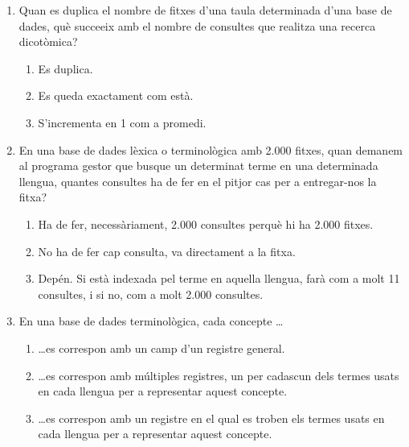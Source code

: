 \begin{enumerate}
\item Quan es duplica el nombre de fitxes d'una taula determinada
  d'una base de dades, què succeeix amb el nombre de consultes que
  realitza una recerca dicotòmica?   
  \begin{enumerate}
  \item Es duplica.
  \item Es queda exactament com està.
  \item S'incrementa en 1 com a promedi.
  \end{enumerate}

\item En una base de dades lèxica o terminològica amb 2.000 fitxes,
  quan demanem al programa gestor que busque un determinat terme en
  una determinada llengua, quantes consultes ha de fer en el pitjor
  cas per a entregar-nos la fitxa?
  \begin{enumerate}
  \item Ha de fer, necessàriament, 2.000 consultes perquè hi ha 2.000
    fitxes.
  \item No ha de fer cap consulta, va directament a la fitxa.
  \item Depén. Si està indexada pel terme en aquella llengua, farà com
    a molt 11 consultes, i si no, com a molt 2.000 consultes.
  \end{enumerate}

\item En una base de dades terminològica, cada concepte \ldots
  \begin{enumerate}
  \item \ldots es correspon amb un camp d'un registre general.
  \item \ldots es correspon amb múltiples registres, un per cadascun
    dels termes usats en cada llengua per a representar aquest
    concepte.
  \item \ldots es correspon amb un registre en el qual es troben els
    termes usats en cada llengua per a representar aquest concepte.
  \end{enumerate}


\end{enumerate}
